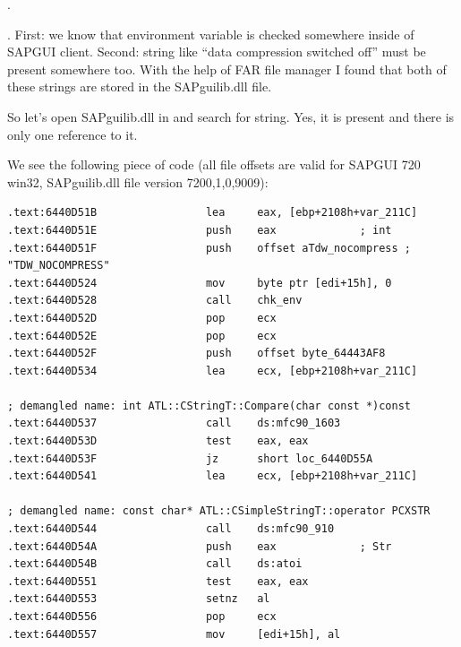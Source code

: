 .

.
{First: we know that environment variable \IT{\TDWNC} is checked somewhere inside of SAPGUI client.}
{Second: string like ``data compression switched off'' must be present somewhere too.}
{With the help of FAR file manager I found that both of these strings are stored in the SAPguilib.dll file.}

{So let's open SAPguilib.dll in \IDA and search for  string. 
Yes, it is present and there is only one reference to it.}

{We see the following piece of code 
(all file offsets are valid for SAPGUI 720 win32, SAPguilib.dll file version 7200,1,0,9009)}:

\begin{lstlisting}
.text:6440D51B                 lea     eax, [ebp+2108h+var_211C]
.text:6440D51E                 push    eax             ; int
.text:6440D51F                 push    offset aTdw_nocompress ; "TDW_NOCOMPRESS"
.text:6440D524                 mov     byte ptr [edi+15h], 0
.text:6440D528                 call    chk_env
.text:6440D52D                 pop     ecx
.text:6440D52E                 pop     ecx
.text:6440D52F                 push    offset byte_64443AF8
.text:6440D534                 lea     ecx, [ebp+2108h+var_211C]

; demangled name: int ATL::CStringT::Compare(char const *)const
.text:6440D537                 call    ds:mfc90_1603
.text:6440D53D                 test    eax, eax
.text:6440D53F                 jz      short loc_6440D55A
.text:6440D541                 lea     ecx, [ebp+2108h+var_211C]

; demangled name: const char* ATL::CSimpleStringT::operator PCXSTR 
.text:6440D544                 call    ds:mfc90_910
.text:6440D54A                 push    eax             ; Str
.text:6440D54B                 call    ds:atoi
.text:6440D551                 test    eax, eax
.text:6440D553                 setnz   al
.text:6440D556                 pop     ecx
.text:6440D557                 mov     [edi+15h], al
\end{lstlisting}

